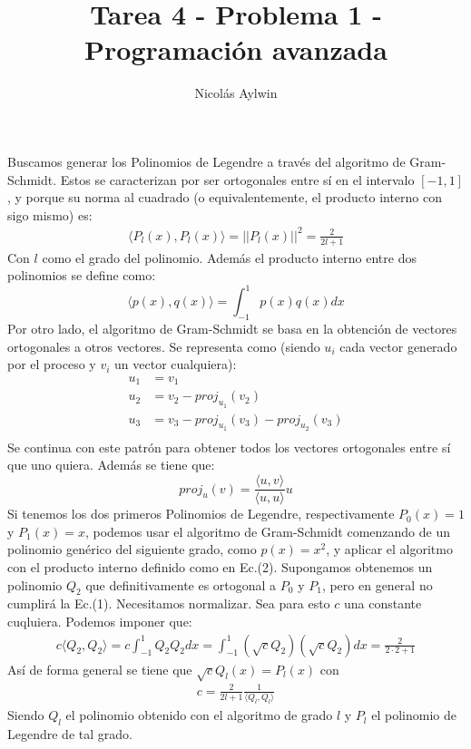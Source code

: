 \documentclass[12pt]{article}
\title{Tarea 4 - Problema 1 - Programación avanzada}
\author{Nicolás Aylwin}
\date{}
\begin{document}
\maketitle
Buscamos generar los Polinomios de Legendre a través del algoritmo de Gram-Schmidt. Estos se caracterizan por ser ortogonales entre sí en el intervalo $[-1,1]$, y porque su norma al cuadrado (o equivalentemente, el producto interno con sigo mismo) es:
\begin{align}
\langle P_l(x),P_l(x)\rangle =||P_l(x)||^2=\frac{2}{2l+1}
\end{align}
Con $l$ como el grado del polinomio. Además el producto interno entre dos polinomios se define como:
\begin{equation}
\langle p(x),q(x) \rangle =\int_{-1}^{1}{p(x)q(x)dx}
\end{equation}
Por otro lado, el algoritmo de Gram-Schmidt se basa en la obtención de vectores ortogonales a otros vectores. Se representa como (siendo $u_i$ cada vector generado por el proceso y $v_i$ un vector cualquiera):
\begin{align*}
u_1&=v_1 \\
u_2&=v_2-proj_{u_1}(v_2) \\
u_3&=v_3-proj_{u_1}(v_3)-proj_{u_2}(v_3) \\
\end{align*}
Se continua con este patrón para obtener todos los vectores ortogonales entre sí que uno quiera. Además se tiene que:
\begin{equation}
proj_{u}(v)=\frac{\langle u,v\rangle}{\langle u,u\rangle}u
\end{equation}
Si tenemos los dos primeros Polinomios de Legendre, respectivamente $P_0(x)=1$ y $P_1(x)=x$, podemos usar el algoritmo de Gram-Schmidt comenzando de un polinomio genérico del siguiente grado, como $p(x)=x^2$, y aplicar el algoritmo con el producto interno definido como en Ec.(2). Supongamos obtenemos un polinomio $Q_2$ que definitivamente es ortogonal a $P_0$ y $P_1$, pero en general no cumplirá la Ec.(1). Necesitamos normalizar. Sea para esto $c$ una constante cuqluiera. Podemos imponer que:
\begin{align*}
c\langle Q_2,Q_2 \rangle =c\int_{-1}^{1}{Q_2 Q_2dx}=\int_{-1}^{1}{(\sqrt{c}Q_2)(\sqrt{c}Q_2)dx}=\frac{2}{2\cdot 2+1}
\end{align*}
Así de forma general se tiene que $\sqrt{c}Q_l(x)=P_l(x)$ con 
\begin{align*}
c=\frac{2}{2l+1}\frac{1}{\langle Q_l,Q_l \rangle}
\end{align*}
Siendo $Q_l$ el polinomio obtenido con el algoritmo de grado $l$ y $P_l$ el polinomio de Legendre de tal grado.
\end{document}

